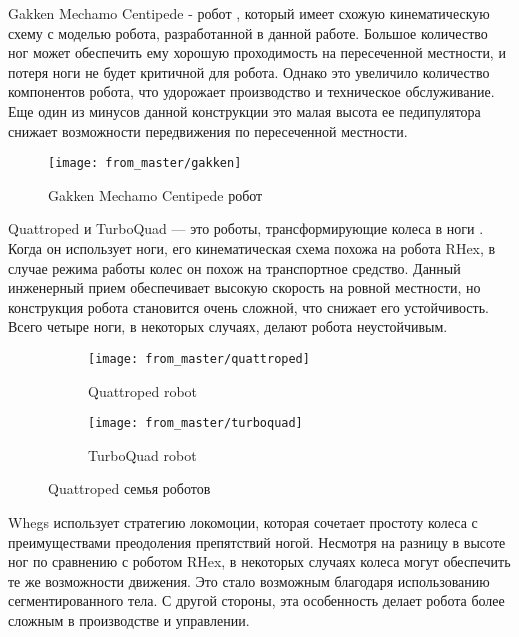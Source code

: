 Gakken Mechamo Centipede \cite{millerExtremeMakeoverHeianera2008, Miller2019} - робот , который имеет схожую кинематическую схему с моделью робота, разработанной в данной работе. Большое количество ног может обеспечить ему хорошую проходимость на пересеченной местности, и потеря ноги не будет критичной для робота. Однако это увеличило количество компонентов робота, что удорожает производство и техническое обслуживание. Еще один из минусов данной конструкции это малая высота ее педипулятора снижает возможности передвижения по пересеченной местности.
\begin{figure}[H]
    \centering\texttt{[image: from\_master/gakken]}\\
    \caption{Gakken Mechamo Centipede робот}
    \label{fig:gakken}
    \end{figure}

Quattroped и TurboQuad \cite{shenDesignLegwheelHybrid2009, Chen2014, Chen2017} --- это роботы, трансформирующие колеса в ноги . Когда он использует ноги, его кинематическая схема похожа на робота RHex, в случае режима работы колес он похож на транспортное средство. Данный инженерный прием обеспечивает высокую скорость на ровной местности, но конструкция робота становится очень сложной, что снижает его устойчивость. Всего четыре ноги, в некоторых случаях, делают робота неустойчивым.

\begin{figure}[H]
    \begin{subfigure}{0.49\textwidth}
    \centering\texttt{[image: from\_master/quattroped]}\\
    \caption{Quattroped robot}
    \label{fig:quattroped}
    \end{subfigure}
    \begin{subfigure}{0.49\textwidth}
    \centering\texttt{[image: from\_master/turboquad]}\\
    \caption{TurboQuad robot}
    \label{fig:turboquad}
    \end{subfigure}
    \caption{Quattroped семья роботов}
    \label{quatro}
    \end{figure}

Whegs \cite{schroerComparingCockroachWhegs2004}  использует стратегию локомоции, которая сочетает простоту колеса с преимуществами преодоления препятствий ногой. Несмотря на разницу в высоте ног по сравнению с роботом RHex, в некоторых случаях колеса могут обеспечить те же возможности движения. Это стало возможным благодаря использованию сегментированного тела. С другой стороны, эта особенность делает робота более сложным в производстве и управлении.

